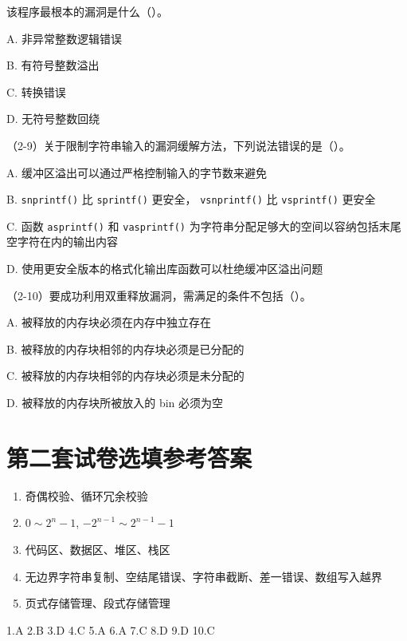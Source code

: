 \documentclass[UTF8]{ctexart}
\begin{document}
\noindent
该程序最根本的漏洞是什么（\quad）。

\noindent
A. 非异常整数逻辑错误

\noindent
B. 有符号整数溢出

\noindent
C. 转换错误

\noindent
D. 无符号整数回绕

\noindent
（2-9）关于限制字符串输入的漏洞缓解方法，下列说法错误的是（\quad）。

\noindent
A. 缓冲区溢出可以通过严格控制输入的字节数来避免

\noindent
B. \texttt{snprintf()} 比 \texttt{sprintf()} 更安全，
\texttt{vsnprintf()} 比 \texttt{vsprintf()} 更安全

\noindent
C. 函数 \texttt{asprintf()} 和 \texttt{vasprintf()}
为字符串分配足够大的空间以容纳包括末尾空字符在内的输出内容

\noindent
D. 使用更安全版本的格式化输出库函数可以杜绝缓冲区溢出问题

\noindent
（2-10）要成功利用双重释放漏洞，需满足的条件不包括（\quad）。

\noindent
A. 被释放的内存块必须在内存中独立存在

\noindent
B. 被释放的内存块相邻的内存块必须是已分配的

\noindent
C. 被释放的内存块相邻的内存块必须是未分配的

\noindent
D. 被释放的内存块所被放入的 bin 必须为空

\section*{第二套试卷选填参考答案}

\begin{framed}

\begin{enumerate}
  \item 奇偶校验、循环冗余校验
  \item $0 \sim 2^{n}-1$, $-2^{n-1} \sim 2^{n-1}-1$
  \item 代码区、数据区、堆区、栈区
  \item 无边界字符串复制、空结尾错误、字符串截断、差一错误、数组写入越界
  \item 页式存储管理、段式存储管理
\end{enumerate}

\noindent
1.A \quad
2.B \quad
3.D \quad
4.C \quad
5.A \quad
6.A \quad
7.C \quad
8.D \quad
9.D \quad
10.C \quad

\end{framed}
\end{document}
